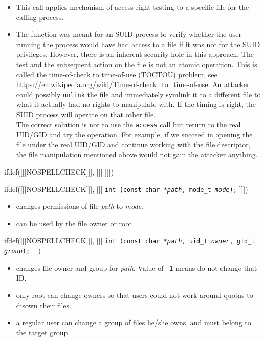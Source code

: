 \begin{itemize}
\item This call applies mechanism of access right testing to a specific file for
the calling process.
\item The function was meant for an SUID process to verify whether the user
running the process would have had access to a file if it was not for the SUID
privileges.  However, there is an inherent security hole in this approach.
The test and the subsequent action on the file is not an atomic operation.
This is called the time-of-check to time-of-use (TOCTOU) problem,
see \url{https://en.wikipedia.org/wiki/Time-of-check\_to\_time-of-use}.
An attacker could possibly \texttt{unlink} the file and immediately symlink it
to a different file to what it actually had no rights to manipulate with.
If the timing is right, the SUID process will operate on that other file.
\\
The correct solution is not to use the \texttt{access} call but return to the
real UID/GID and try the operation.  For example, if we succeed in opening the
file under the real UID/GID and continue working with the file descriptor, the
file manipulation mentioned above would not gain the attacker anything.
\end{itemize}


ifdef([[[NOSPELLCHECK]]], [[[
]]])

\begin{slide}
ifdef([[[NOSPELLCHECK]]], [[[
\texttt{int (const char *\emph{path}, mode\_t \emph{mode});}
]]])
\begin{itemize}
\item changes permissions of file \emph{path} to \emph{mode}.
\item can be used by the file owner or root
\end{itemize}
ifdef([[[NOSPELLCHECK]]], [[[
\texttt{int (const char *\emph{path}, uid\_t \emph{owner},
gid\_t \emph{group});}
]]])
\begin{itemize}
\item changes file owner and group for \emph{path}.  Value of
\texttt{-1} means do not change that ID.
\item only root can change owners so that users could not work around quotas
to disown their files
\item a regular user can change a group of files he/she owns, and must belong to
the target group
\end{itemize}
\end{slide}

